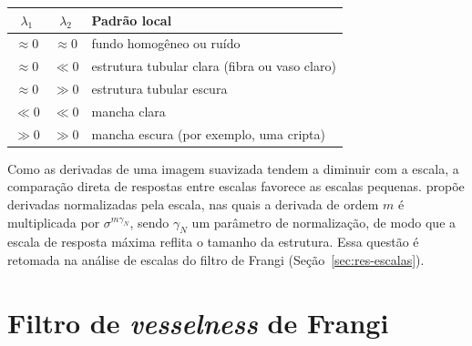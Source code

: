 \documentclass[12pt, oneside, a4paper, chapter=TITLE, section=TITLE,
               english, brazil]{abntex2}
\newcommand{\secao}[1]{\section[\texorpdfstring{\protect\MakeTextUppercase{#1}}{#1}]{#1}}
\begin{document}
\begin{quadro}[htbp]
  \caption{Padrões locais de intensidade em duas dimensões segundo os
  autovalores da matriz hessiana}
  \label{qua:autovalores}
  \footnotesize
  \renewcommand{\arraystretch}{1.25}
  \begin{tabular}{|c|c|l|}
    \hline
    $\lambda_1$ & $\lambda_2$ & \textbf{Padrão local} \\ \hline
    $\approx 0$ & $\approx 0$ & fundo homogêneo ou ruído \\ \hline
    $\approx 0$ & $\ll 0$     & estrutura tubular clara (fibra ou vaso claro) \\ \hline
    $\approx 0$ & $\gg 0$     & estrutura tubular escura \\ \hline
    $\ll 0$     & $\ll 0$     & mancha clara \\ \hline
    $\gg 0$     & $\gg 0$     & mancha escura (por exemplo, uma cripta) \\ \hline
  \end{tabular}
\end{quadro}

Como as derivadas de uma imagem suavizada tendem a diminuir com a escala, a
comparação direta de respostas entre escalas favorece as escalas pequenas.
\citet{Lindeberg1998} propõe derivadas normalizadas pela escala, nas quais a
derivada de ordem $m$ é multiplicada por $\sigma^{m\gamma_N}$, sendo
$\gamma_N$ um parâmetro de normalização, de modo que a escala de resposta
máxima reflita o tamanho da estrutura. Essa questão é retomada na análise de
escalas do filtro de Frangi (Seção~\ref{sec:res-escalas}).

\secao{Filtro de \emph{vesselness} de Frangi}
\end{document}
